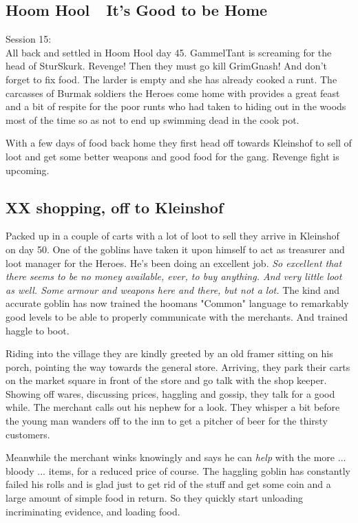 \subsection*{Hoom Hool~\mdash~It's Good to be Home}

\forceindent Session 15:\\                                              %
All back and settled in Hoom Hool day 45. GammelTant is screaming for the head of SturSkurk. Revenge! Then they must go kill GrimGnash! And don't forget to fix food. The larder is empty and she has already cooked a runt.
The carcasses of Burmak soldiers the Heroes come home with provides a great feast and a bit of respite for the poor runts who had taken to hiding out in the woods most of the time so as not to end up swimming dead in the cook pot.

With a few days of food back home they first head off towards Kleinshof to sell of loot and get some better weapons and good food for the gang. Revenge fight is upcoming.


\subsection*{XX shopping, off to Kleinshof}

Packed up in a couple of carts with a lot of loot to sell they arrive in Kleinshof on day 50. One of the goblins have taken it upon himself to act as treasurer and loot manager for the Heroes. He's been doing an excellent job. \emph{So excellent that there seems to be no money available, ever, to buy anything. And very little loot as well. Some armour and weapons here and there, but not a lot.} The kind and accurate goblin has now trained the hoomans "Common" language to remarkably good levels to be able to properly communicate with the merchants. And trained haggle to boot.

Riding into the village they are kindly greeted by an old framer sitting on his porch, pointing the way towards the general store. Arriving, they park their carts on the market square in front of the store and go talk with the shop keeper. Showing off wares, discussing prices, haggling and gossip, they talk for a good while. The merchant calls out his nephew for a look. They whisper a bit before the young man wanders off to the inn to get a pitcher of beer for the thirsty customers.

Meanwhile the merchant winks knowingly and says he can \emph{help} with the more ... bloody ... items, for a reduced price of course. The haggling goblin has constantly failed his rolls and is glad just to get rid of the stuff and get some coin and a large amount of simple food in return. So they quickly start unloading incriminating evidence, and loading food.

